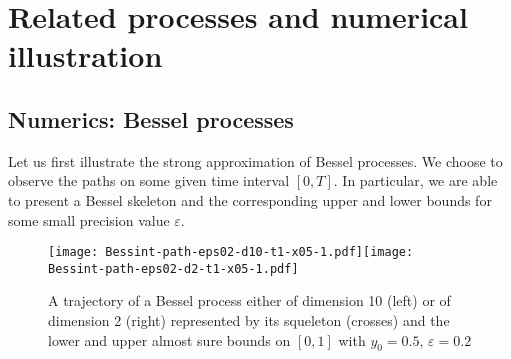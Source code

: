 \documentclass[12pt]{article}
\numberwithin{equation}{section}
\begin{document}
\section{Related processes and numerical illustration}\label{sec:num}
\subsection{Numerics: Bessel processes}
Let us first illustrate the strong approximation of Bessel processes. We choose to observe the paths on some given time interval $[0,T]$. In particular, we are able to present a Bessel skeleton and the corresponding upper and lower bounds for some small precision value $\varepsilon$. 

\begin{figure}[h]
\centering
\texttt{[image: Bessint-path-eps02-d10-t1-x05-1.pdf]}\hspace*{-0.7cm}\texttt{[image: Bessint-path-eps02-d2-t1-x05-1.pdf]}
\caption{\small A trajectory of a Bessel process either of dimension 10 (left) or of dimension 2 (right) represented by its squeleton (crosses) and the lower and upper almost sure bounds on $[0,1]$ with $y_0=0.5$, $\varepsilon=0.2$}
\label{fig:my_label1}
\end{figure}
\end{document}
